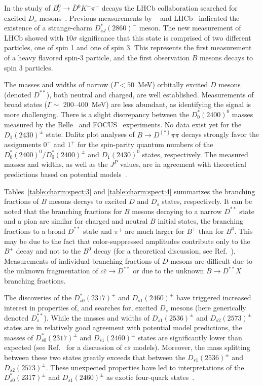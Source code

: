In the study of $B_{s}^{0}\to \overline{D}{}^{0}K^{-}\pi^{+}$ decays the LHCb collaboration searched for excited $D_{s}$ mesons~\cite{Aaij:2014xza}.  Previous measurements by \babar{}~\cite{Aubert:2009ah} and LHCb~\cite{Aaij:2012pc} indicated the existence of a strange-charm $D^{*}_{sJ}(2860)^{-}$ meson. The new measurement of LHCb showed with $10\sigma$ significance that this state is comprised of two different particles,  one of spin 1 and one of spin 3. This represents the first measurement of a heavy flavored spin-3 particle, and the first observation $B$ mesons decays to spin 3 particles.

The masses and widths of narrow ($\Gamma<50$~MeV) orbitally excited $D$ mesons (denoted $D^{\ast\ast}$), both neutral and charged, are well established. Measurements of broad states ($\Gamma\sim$ 200--400~MeV) are less abundant, as identifying the signal is more challenging. There is a slight discrepancy between the 
$D_0^\ast(2400)^0$ masses measured by the Belle~\cite{Abe:2003zm} and  FOCUS~\cite{Link:2003bd} experiments. No data exist yet for the $D_1(2430)^{\pm}$ state. Dalitz plot analyses of $B\to D^{(\ast)}\pi\pi$ decays strongly favor the assignments $0^+$ and $1^+$ for the spin-parity quantum numbers of the $D_0^\ast(2400)^0/D_0^\ast(2400)^\pm$ and $D_1(2430)^{0}$ states, respectively. The measured masses and widths, as well as the $J^P$ values, are in agreement with theoretical predictions based on potential models~\cite{Godfrey:1985xj, Godfrey:1986wj, Isgur:1991wq, Schweitzer:2002nm}. 


Tables~\ref{table:charm:spect:3} and \ref{table:charm:spect:4} summarizes the branching fractions of $B$ mesons decays to excited $D$ and $D_{s}$ states, respectively. It can be noted that the branching fractions for $B$ mesons decaying to a narrow $D^{\ast\ast}$ state and a pion are similar for charged and neutral $B$ initial states, the branching fractions to a broad $D^{\ast\ast}$ state and $\pi^+$ are much larger for $B^+$ than for $B^0$. This may be due to the fact that color-suppressed amplitudes contribute only to the $B^+$ decay and not to the $B^0$ decay (for a theoretical discussion, see Ref.~\citep{Jugeau:2005yr,Colangelo:2004vu}). Measurements of individual branching fractions of $D$ mesons are difficult due to the unknown fragmentation of $c\bar c \to D^{\ast\ast}$ or due to the unknown $B \to D^{\ast\ast} X$ branching fractions.

The discoveries of the $D_{s0}^\ast(2317)^{\pm}$ and $D_{s1}(2460)^{\pm}$ have triggered increased interest in properties of, and searches for, excited $D_s$ mesons (here generically denoted $D_s^{\ast\ast}$). While the masses and widths of $D_{s1}(2536)^{\pm}$ and $D_{s2}(2573)^{\pm}$ states are in relatively good agreement with potential model predictions, the masses of $D_{s0}^\ast(2317)^{\pm}$ and $D_{s1}(2460)^{\pm}$ states are significantly lower than expected (see Ref.~\cite{Cahn:2003cw} for a discussion of $c\bar{s}$ models). Moreover, the mass splitting between these two states greatly exceeds that between the $D_{s1}(2536)^{\pm}$ and $D_{s2}(2573)^{\pm}$. These unexpected properties have led to interpretations of the $D_{s0}^\ast(2317)^{\pm}$ and $D_{s1}(2460)^{\pm}$ as exotic four-quark states~\cite{Barnes:2003dj,Lipkin:2003zk}.

